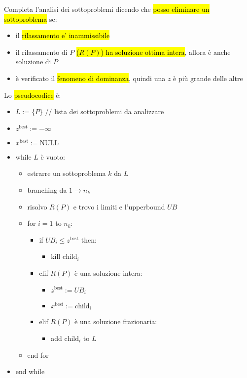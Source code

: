 Completa l'analisi dei sottoproblemi dicendo che \hl{posso eliminare un sottoproblema} se:

\begin{itemize}
    \item il \hl{rilassamento e' inammissibile}
    \item il rilassamento di $P$ \hl{($R(P)$) ha soluzione ottima intera}, allora è anche soluzione di $P$
    \item è verificato il \hl{fenomeno di dominanza}, quindi una $z$ è più grande delle altre
\end{itemize}

Lo \hl{pseudocodice} è:

\begin{itemize}
    \item[] $L := \{P\}$ // lista dei sottoproblemi da analizzare
    \item[] $z^{\text{best}} := -\infty$
    \item[] $x^{\text{best}} := \text{NULL}$
    \item[] while $L$ è vuoto:
    \begin{itemize}
        \item[] estrarre un sottoproblema $k$ da $L$
        \item[] branching da $1 \to n_k$
        \item[] risolvo $R(P)$ e trovo i limiti e l'upperbound $UB$
        \item[] for $i = 1$ to $n_k$:
        \begin{itemize}
            \item[] if $UB_i \leq z^{\text{best}}$ then:
            \begin{itemize}
                \item[] kill $\text{child}_i$
            \end{itemize}
            \item[] elif $R(P)$ è una soluzione intera:
            \begin{itemize}
                \item[] $z^{\text{best}} := UB_i$
                \item[] $x^{\text{best}} := \text{child}_i$
            \end{itemize}
            \item[] elif $R(P)$ è una soluzione frazionaria:
            \begin{itemize}
                \item[] add $\text{child}_i$ to $L$
            \end{itemize}
        \end{itemize}
        \item[] end for
    \end{itemize}
    \item[] end while
\end{itemize}


